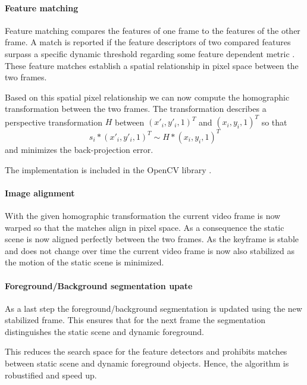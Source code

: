 \paragraph{Feature matching}
Feature matching compares the features of one frame to the features of the other frame.
A match is reported if the feature descriptors of two compared features surpass a specific dynamic
threshold \cite{lowe10.1023/B:VISI.0000029664.99615.94} regarding some feature
dependent metric \cite{kumar2014survey}.
These feature matches establish a spatial relationship in pixel space between
the two frames.

Based on this spatial pixel relationship we can now compute the homographic
transformation between the two frames. The transformation describes a
perspective transformation $H$ between $(x'_i, y'_i, 1)^T$ and
$(x_i, y_i, 1)^T$ so that
\begin{equation}
 s_i  * (x'_i, y'_i, 1)^T \sim H * (x_i, y_i, 1)^T
 \label{eq:homographic_transformation}
\end{equation}
and minimizes the back-projection error.

The implementation is included in the OpenCV library \cite{opencv_library}.

\paragraph{Image alignment}
With the given homographic transformation the current video frame is now warped so that the matches align in pixel space.
As a consequence the static scene is now aligned perfectly between the two frames. 
As the keyframe is stable and does not change over time the current video frame
is now also stabilized as the motion of the static scene is minimized.

\paragraph{Foreground/Background segmentation upate}
As a last step the foreground/background segmentation is updated using the new
stabilized frame. This ensures that for the next frame the segmentation
distinguishes the static scene and dynamic foreground. 

This reduces the search space for the feature detectors and prohibits matches
between static scene and dynamic foreground objects. Hence, the algorithm is
robustified and speed up.
